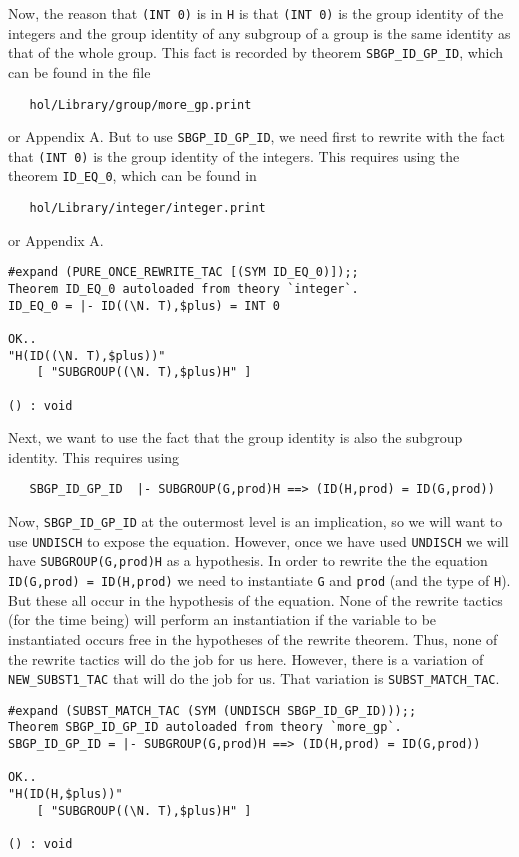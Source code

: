 Now, the reason that {\small\verb+(INT 0)+} is in {\small\tt H}
is that {\small\verb+(INT 0)+} is the group identity of the
integers and the group identity of any subgroup of a group is the same
identity as that of the whole group.  This fact is recorded by theorem
{\small\verb+SBGP_ID_GP_ID+}, which can be found in the file
\begin{verbatim}
   hol/Library/group/more_gp.print
\end{verbatim}
or Appendix A.  But to use {\small\verb+SBGP_ID_GP_ID+}, we need
first to rewrite with the fact that {\small\verb+(INT 0)+} is the
group identity of the integers.  This requires using the theorem
{\small\verb+ID_EQ_0+}, which
can be found in
\begin{verbatim}
   hol/Library/integer/integer.print
\end{verbatim}
or Appendix A.
\begin{session}
\begin{verbatim}
#expand (PURE_ONCE_REWRITE_TAC [(SYM ID_EQ_0)]);;
Theorem ID_EQ_0 autoloaded from theory `integer`.
ID_EQ_0 = |- ID((\N. T),$plus) = INT 0

OK..
"H(ID((\N. T),$plus))"
    [ "SUBGROUP((\N. T),$plus)H" ]

() : void
\end{verbatim}
\end{session}

Next, we want to use the fact that the group identity is also the
subgroup identity.  This requires using
\begin{verbatim}
   SBGP_ID_GP_ID  |- SUBGROUP(G,prod)H ==> (ID(H,prod) = ID(G,prod))
\end{verbatim}
Now, {\small\verb+SBGP_ID_GP_ID+} at the outermost level is an
implication, so we will want to use {\small\verb+UNDISCH+} to
expose the equation.  However, once we have used
{\small\verb+UNDISCH+} we will have
{\small\verb+SUBGROUP(G,prod)H+} as a hypothesis.  In order to
rewrite the the equation {\small\verb+ID(G,prod) = ID(H,prod)+}
we need to instantiate {\small\tt G} and {\small\verb+prod+} (and
the type of {\small\tt H}).  But these all occur in the hypothesis of
the equation.  None of the rewrite tactics (for the time being) will
perform an instantiation if the variable to be instantiated occurs
free in the hypotheses of the rewrite theorem.  Thus, none of the
rewrite tactics will do the job for us here.  However, there is a
variation of {\small\verb+NEW_SUBST1_TAC+} that will do the job
for us.  That variation is {\small\verb+SUBST_MATCH_TAC+}.
\begin{session}
\begin{verbatim}
#expand (SUBST_MATCH_TAC (SYM (UNDISCH SBGP_ID_GP_ID)));;
Theorem SBGP_ID_GP_ID autoloaded from theory `more_gp`.
SBGP_ID_GP_ID = |- SUBGROUP(G,prod)H ==> (ID(H,prod) = ID(G,prod))

OK..
"H(ID(H,$plus))"
    [ "SUBGROUP((\N. T),$plus)H" ]

() : void
\end{verbatim}
\end{session}


